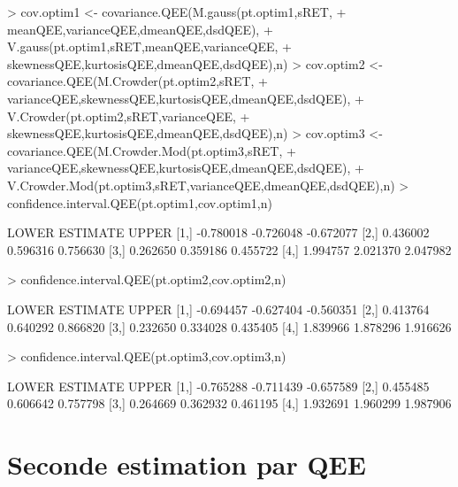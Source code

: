 \documentclass{report}
\begin{document}
\begin{Schunk}
\begin{Sinput}
> cov.optim1 <- covariance.QEE(M.gauss(pt.optim1,sRET,
+ 				meanQEE,varianceQEE,dmeanQEE,dsdQEE),
+ 		V.gauss(pt.optim1,sRET,meanQEE,varianceQEE,
+ 				skewnessQEE,kurtosisQEE,dmeanQEE,dsdQEE),n)
> cov.optim2 <- covariance.QEE(M.Crowder(pt.optim2,sRET,
+ 				varianceQEE,skewnessQEE,kurtosisQEE,dmeanQEE,dsdQEE),
+ 		V.Crowder(pt.optim2,sRET,varianceQEE,
+ 				skewnessQEE,kurtosisQEE,dmeanQEE,dsdQEE),n)
> cov.optim3 <- covariance.QEE(M.Crowder.Mod(pt.optim3,sRET,
+ 				varianceQEE,skewnessQEE,kurtosisQEE,dmeanQEE,dsdQEE),
+ 		V.Crowder.Mod(pt.optim3,sRET,varianceQEE,dmeanQEE,dsdQEE),n)
> confidence.interval.QEE(pt.optim1,cov.optim1,n)
\end{Sinput}
\begin{Soutput}
         LOWER  ESTIMATE     UPPER
[1,] -0.780018 -0.726048 -0.672077
[2,]  0.436002  0.596316  0.756630
[3,]  0.262650  0.359186  0.455722
[4,]  1.994757  2.021370  2.047982
\end{Soutput}
\begin{Sinput}
> confidence.interval.QEE(pt.optim2,cov.optim2,n)
\end{Sinput}
\begin{Soutput}
         LOWER  ESTIMATE     UPPER
[1,] -0.694457 -0.627404 -0.560351
[2,]  0.413764  0.640292  0.866820
[3,]  0.232650  0.334028  0.435405
[4,]  1.839966  1.878296  1.916626
\end{Soutput}
\begin{Sinput}
> confidence.interval.QEE(pt.optim3,cov.optim3,n)
\end{Sinput}
\begin{Soutput}
         LOWER  ESTIMATE     UPPER
[1,] -0.765288 -0.711439 -0.657589
[2,]  0.455485  0.606642  0.757798
[3,]  0.264669  0.362932  0.461195
[4,]  1.932691  1.960299  1.987906
\end{Soutput}
\end{Schunk}

\section{Seconde estimation par QEE}

\begin{Schunk}
\end{Schunk}
\end{document}
